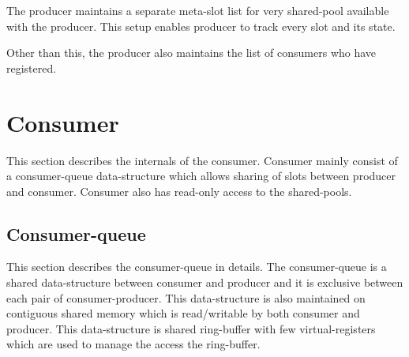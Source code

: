 \documentclass[a4paper,twoside]{report} %
\begin{document}
The producer maintains a separate meta-slot list for very shared-pool
available with the producer.  This setup enables producer to track 
every slot and its state.

Other than this, the producer also maintains the list of consumers who
have registered.

\section{Consumer}
This section describes the internals of the consumer.  Consumer mainly
consist of a consumer-queue data-structure which allows sharing of
slots between producer and consumer.  Consumer also has read-only 
access to the shared-pools.


\subsection{Consumer-queue}
This section describes the consumer-queue in details.
The consumer-queue is a shared data-structure between consumer and
producer and it is exclusive between each pair of consumer-producer.
This data-structure is also maintained on contiguous shared memory 
which is read/writable by both consumer and producer.  This
data-structure is shared ring-buffer with few virtual-registers 
which are used to manage the access the ring-buffer.
\end{document}
